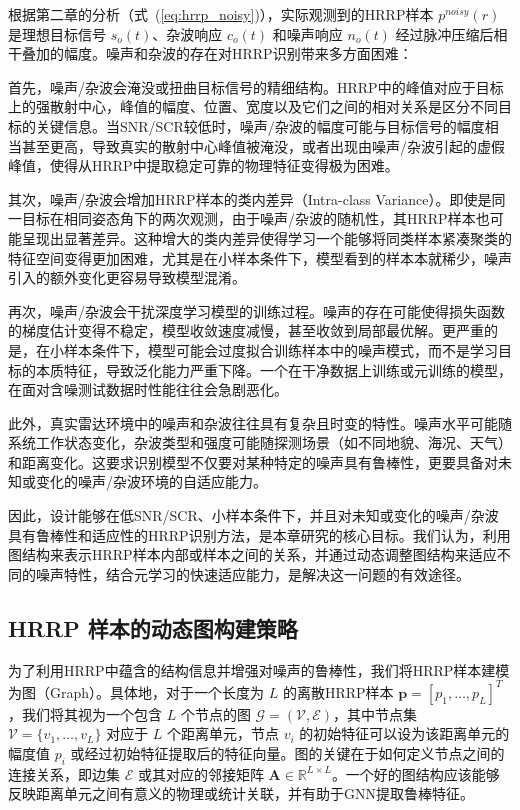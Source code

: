 根据第二章的分析（式~(\ref{eq:hrrp_noisy})），实际观测到的HRRP样本 $p^{noisy}(r)$ 是理想目标信号 $s_o(t)$、杂波响应 $c_o(t)$ 和噪声响应 $n_o(t)$ 经过脉冲压缩后相干叠加的幅度。噪声和杂波的存在对HRRP识别带来多方面困难：

首先，噪声/杂波会淹没或扭曲目标信号的精细结构。HRRP中的峰值对应于目标上的强散射中心，峰值的幅度、位置、宽度以及它们之间的相对关系是区分不同目标的关键信息。当SNR/SCR较低时，噪声/杂波的幅度可能与目标信号的幅度相当甚至更高，导致真实的散射中心峰值被淹没，或者出现由噪声/杂波引起的虚假峰值，使得从HRRP中提取稳定可靠的物理特征变得极为困难。

其次，噪声/杂波会增加HRRP样本的类内差异（Intra-class Variance）。即使是同一目标在相同姿态角下的两次观测，由于噪声/杂波的随机性，其HRRP样本也可能呈现出显著差异。这种增大的类内差异使得学习一个能够将同类样本紧凑聚类的特征空间变得更加困难，尤其是在小样本条件下，模型看到的样本本就稀少，噪声引入的额外变化更容易导致模型混淆。

再次，噪声/杂波会干扰深度学习模型的训练过程。噪声的存在可能使得损失函数的梯度估计变得不稳定，模型收敛速度减慢，甚至收敛到局部最优解。更严重的是，在小样本条件下，模型可能会过度拟合训练样本中的噪声模式，而不是学习目标的本质特征，导致泛化能力严重下降。一个在干净数据上训练或元训练的模型，在面对含噪测试数据时性能往往会急剧恶化。

此外，真实雷达环境中的噪声和杂波往往具有复杂且时变的特性。噪声水平可能随系统工作状态变化，杂波类型和强度可能随探测场景（如不同地貌、海况、天气）和距离变化。这要求识别模型不仅要对某种特定的噪声具有鲁棒性，更要具备对未知或变化的噪声/杂波环境的自适应能力。

因此，设计能够在低SNR/SCR、小样本条件下，并且对未知或变化的噪声/杂波具有鲁棒性和适应性的HRRP识别方法，是本章研究的核心目标。我们认为，利用图结构来表示HRRP样本内部或样本之间的关系，并通过动态调整图结构来适应不同的噪声特性，结合元学习的快速适应能力，是解决这一问题的有效途径。

\subsection{HRRP 样本的动态图构建策略}
\label{subsec:dynamic_graph_construction}

为了利用HRRP中蕴含的结构信息并增强对噪声的鲁棒性，我们将HRRP样本建模为图（Graph）。具体地，对于一个长度为 $L$ 的离散HRRP样本 $\mathbf{p} = [p_1, \dots, p_L]^T$，我们将其视为一个包含 $L$ 个节点的图 $\mathcal{G} = (\mathcal{V}, \mathcal{E})$，其中节点集 $\mathcal{V} = \{v_1, \dots, v_L\}$ 对应于 $L$ 个距离单元，节点 $v_i$ 的初始特征可以设为该距离单元的幅度值 $p_i$ 或经过初始特征提取后的特征向量。图的关键在于如何定义节点之间的连接关系，即边集 $\mathcal{E}$ 或其对应的邻接矩阵 $\mathbf{A} \in \mathbb{R}^{L \times L}$。一个好的图结构应该能够反映距离单元之间有意义的物理或统计关联，并有助于GNN提取鲁棒特征。

